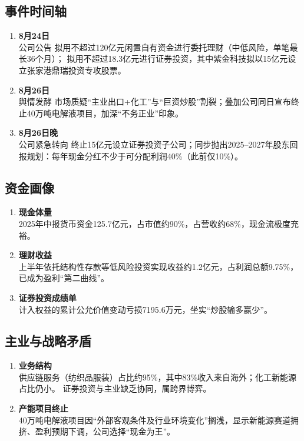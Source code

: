 \subsection{事件时间轴}
\begin{enumerate}[leftmargin=*, nosep]
    \item \textbf{8月24日}\\
    公司公告  
    拟用不超过120亿元闲置自有资金进行委托理财（中低风险，单笔最长36个月）；  
    拟用不超过18.3亿元进行证券投资，其中紫金科技拟以15亿元设立张家港鼎瑞投资专攻股票。
    \item \textbf{8月26日}\\
    舆情发酵  
    市场质疑“主业出口+化工”与“巨资炒股”割裂；叠加公司同日宣布终止40万吨电解液项目，加深“不务正业”印象。
    \item \textbf{8月26日晚} \\
    公司紧急转向  终止15亿元设立证券投资子公司；同步抛出2025–2027年股东回报规划：每年现金分红不少于可分配利润40\%（此前仅10\%）。
\end{enumerate}

\subsection{资金画像}
\begin{enumerate}[leftmargin=*, nosep]
    \item \textbf{现金体量}  \\
    2025年中报货币资金125.7亿元，占市值约90\%，占营收约68\%，现金流极度充裕。
    \item \textbf{理财收益}  \\
    上半年依托结构性存款等低风险投资实现收益约1.2亿元，占利润总额9.75\%，已成为盈利“第二曲线”。
    \item \textbf{证券投资成绩单}  \\
    计入权益的累计公允价值变动亏损7195.6万元，坐实“炒股输多赢少”。
\end{enumerate}

\subsection{主业与战略矛盾}
\begin{enumerate}[leftmargin=*, nosep]
    \item \textbf{业务结构}  \\
    供应链服务（纺织品服装）占比约95\%，其中83\%收入来自海外；化工新能源占比仍小。  
    证券投资与主业缺乏协同，属跨界博弈。
    \item \textbf{产能项目终止}  \\
    40万吨电解液项目因“外部客观条件及行业环境变化”搁浅，显示新能源赛道拥挤、盈利预期下调，公司选择“现金为王”。
\end{enumerate}

